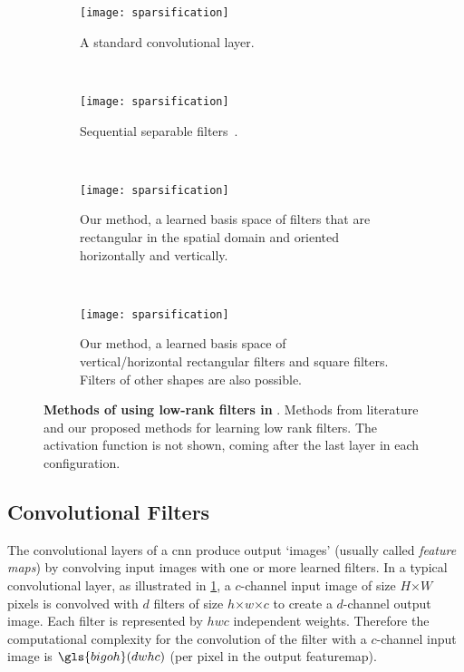 \documentclass[thesis]{subfiles}
\begin{document}
    \begin{figure}[tbp] 
        \begin{subfigure}[b]{0.98\textwidth}
            \centering
            \texttt{[image: sparsification]}
            \caption{A standard convolutional layer.}\label{fig:fullrank}
        \end{subfigure}\\
        \begin{subfigure}[b]{0.98\textwidth}
            \centering
            \texttt{[image: sparsification]}
            \caption{Sequential separable filters~\citep{journals/corr/JaderbergVZ14}.}\label{fig:separableseq}
        \end{subfigure}\\
        \begin{subfigure}[b]{0.98\textwidth}
            \centering
            \texttt{[image: sparsification]}
            \caption{Our method, a learned basis space of filters that are rectangular in the spatial domain and oriented horizontally and vertically.}\label{fig:ourmethod}
        \end{subfigure}\\
        \begin{subfigure}[b]{0.98\textwidth}
            \centering
            \texttt{[image: sparsification]}
            \caption{Our method, a learned basis space of vertical/horizontal rectangular filters and square filters. Filters of other shapes are also possible.}\label{fig:ourmethodfullrank}
        \end{subfigure}
        \caption[Overview of methods of using low-rank filters]{\textbf{Methods of using low-rank filters in }. Methods from literature and our proposed methods for learning low rank filters. The activation function is not shown, coming after the last layer in each configuration.}\label{fig:separablemethods}
    \end{figure}
    
    \subsection{Convolutional Filters}
    
    The convolutional layers of a \gls{cnn} produce output `images' (usually called \emph{feature maps}) by convolving input images with one or more learned filters. %
    In a typical convolutional layer, as illustrated in \cref{fig:fullrank}, a $c$-channel input image of size $H$$\times$$W$ pixels is convolved with $d$ filters of size $h$$\times$$w$$\times$$c$ to create a $d$-channel output image. Each filter is represented by $h w c$ independent weights. Therefore the computational complexity for the convolution of the filter with a $c$-channel input image is $\gls{bigoh}(d w h c)$ (per pixel in the output \gls{featuremap}).
    
\end{document}
